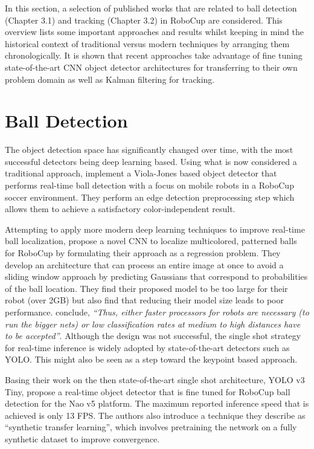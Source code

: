 \documentclass[a4paper,twoside,12pt]{report}
\begin{document}
In this section, a selection of published works that are related to ball detection  (Chapter 3.1) and tracking (Chapter 3.2) in RoboCup are considered. This overview lists some important approaches and results whilst keeping in mind the historical context of traditional versus modern techniques by arranging them chronologically. It is shown that recent approaches take advantage of fine tuning state-of-the-art CNN object detector architectures for transferring to their own problem domain as well as Kalman filtering for tracking.

\section{Ball Detection}
\label{section:balldetection}

The object detection space has significantly changed over time, with the most successful detectors being deep learning based. Using what is now considered a traditional approach, \cite{robovj} implement a Viola-Jones based object detector that performs real-time ball detection with a focus on mobile robots in a RoboCup soccer environment. They perform an edge detection preprocessing step which allows them to achieve a satisfactory color-independent result.

Attempting to apply more modern deep learning techniques to improve real-time ball localization, \cite{selfcnn} propose a novel CNN to localize multicolored, patterned balls for RoboCup by formulating their approach as a regression problem. They develop an architecture that can process an entire image at once to avoid a sliding window approach by predicting Gaussians that correspond to probabilities of the ball location. They find their proposed model to be too large for their robot (over 2GB) but also find that reducing their model size leads to poor performance. \cite{selfcnn} conclude, \textit{``Thus, either faster processors for robots are necessary (to run the bigger nets) or low classification rates at medium to high distances have to be accepted''}. Although the design was not successful, the single shot strategy for real-time inference is widely adopted by state-of-the-art detectors such as YOLO. This might also be seen as a step toward the keypoint based approach.

\pagebreak

Basing their work on the then state-of-the-art single shot architecture, YOLO v3 Tiny, \cite{robo} propose a real-time object detector that is fine tuned for RoboCup ball detection for the Nao v5 platform. The maximum reported inference speed that is achieved is only 13 FPS. The authors also introduce a technique they describe as ``synthetic transfer learning'', which involves pretraining the network on a fully synthetic dataset to improve convergence. 
\end{document}
